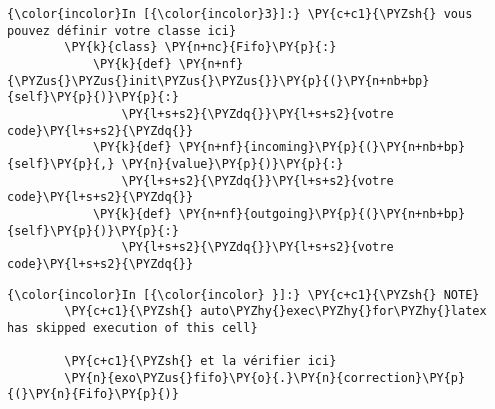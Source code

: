     \begin{Verbatim}[commandchars=\\\{\}]
{\color{incolor}In [{\color{incolor}3}]:} \PY{c+c1}{\PYZsh{} vous pouvez définir votre classe ici}
        \PY{k}{class} \PY{n+nc}{Fifo}\PY{p}{:}
            \PY{k}{def} \PY{n+nf}{\PYZus{}\PYZus{}init\PYZus{}\PYZus{}}\PY{p}{(}\PY{n+nb+bp}{self}\PY{p}{)}\PY{p}{:}
                \PY{l+s+s2}{\PYZdq{}}\PY{l+s+s2}{votre code}\PY{l+s+s2}{\PYZdq{}}
            \PY{k}{def} \PY{n+nf}{incoming}\PY{p}{(}\PY{n+nb+bp}{self}\PY{p}{,} \PY{n}{value}\PY{p}{)}\PY{p}{:}
                \PY{l+s+s2}{\PYZdq{}}\PY{l+s+s2}{votre code}\PY{l+s+s2}{\PYZdq{}}
            \PY{k}{def} \PY{n+nf}{outgoing}\PY{p}{(}\PY{n+nb+bp}{self}\PY{p}{)}\PY{p}{:}
                \PY{l+s+s2}{\PYZdq{}}\PY{l+s+s2}{votre code}\PY{l+s+s2}{\PYZdq{}}
\end{Verbatim}


    \begin{Verbatim}[commandchars=\\\{\}]
{\color{incolor}In [{\color{incolor} }]:} \PY{c+c1}{\PYZsh{} NOTE}
        \PY{c+c1}{\PYZsh{} auto\PYZhy{}exec\PYZhy{}for\PYZhy{}latex has skipped execution of this cell}
        
        \PY{c+c1}{\PYZsh{} et la vérifier ici}
        \PY{n}{exo\PYZus{}fifo}\PY{o}{.}\PY{n}{correction}\PY{p}{(}\PY{n}{Fifo}\PY{p}{)}
\end{Verbatim}



    
    
    
